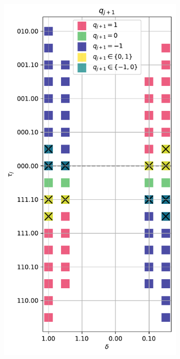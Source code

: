 \documentclass{article}
\begin{document}
\begin{figure}[htbp]
  \centering
  \begin{subfigure}[b]{0.32\textwidth}
    \centering
    \includegraphics[width=\textwidth, height=3.5\textwidth, keepaspectratio=true]{../figures/division/radix2_qds_basic_quadrants_1_2_3_4.pdf}

\end{subfigure}
\end{figure}
\end{document}
